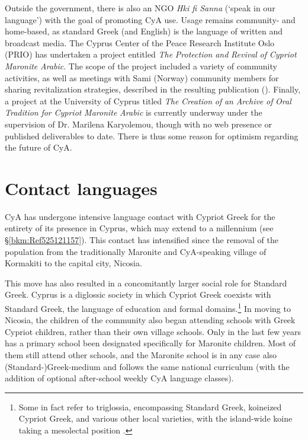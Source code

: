 \documentclass[output=paper]{langsci/langscibook}
\begin{document}
Outside the government, there is also an NGO \textit{Hki fi Sanna} (‘speak in our language’) with the goal of promoting CyA use. Usage remains community- and home-based, as standard Greek (and English) is the language of written and broadcast media. The Cyprus Center of the Peace Research Institute Oslo (PRIO) has undertaken a project entitled \textit{The} \textit{Protection} \textit{and} \textit{Revival} \textit{of} \textit{Cypriot} \textit{Maronite} \textit{Arabic}. The scope of the project included a variety of community activities, as well as meetings with Sami (Norway) community members for sharing revitalization strategies, described in the resulting publication (\citealt{PRIO2009}). Finally, a project at the University of Cyprus titled \textit{The} \textit{Creation} \textit{of} \textit{an} \textit{Archive} \textit{of} \textit{Oral} \textit{Tradition} \textit{for} \textit{Cypriot} \textit{Maronite} \textit{Arabic} is currently underway under the supervision of Dr. Marilena Karyolemou, though with no web presence or published deliverables to date. There is thus some reason for optimism regarding the future of CyA.

\section{\label{bkm:Ref525122525}Contact languages}

CyA has undergone intensive language contact with Cypriot Greek for the entirety of its presence in Cyprus, which may extend to a millennium (see §\ref{bkm:Ref525121157}). This contact has intensified since the removal of the population from the traditionally Maronite and CyA-speaking village of Kormakiti to the capital city, Nicosia. 

This move has also resulted in a concomitantly larger social role for Standard Greek. Cyprus is a diglossic society in which Cypriot Greek coexists with Standard Greek, the language of education and formal domains.\footnote{Some in fact refer to triglossia, encompassing Standard Greek, koineized Cypriot Greek, and various other local varieties, with the island-wide koine taking a mesolectal position \citep{Arvaniti2010}.} In moving to Nicosia, the children of the community also began attending schools with Greek Cypriot children, rather than their own village schools. Only in the last few years has a primary school been designated specifically for Maronite children. Most of them still attend other schools, and the Maronite school is in any case also (Standard-)Greek-medium and follows the same national curriculum (with the addition of optional after-school weekly CyA language classes).
\end{document}
